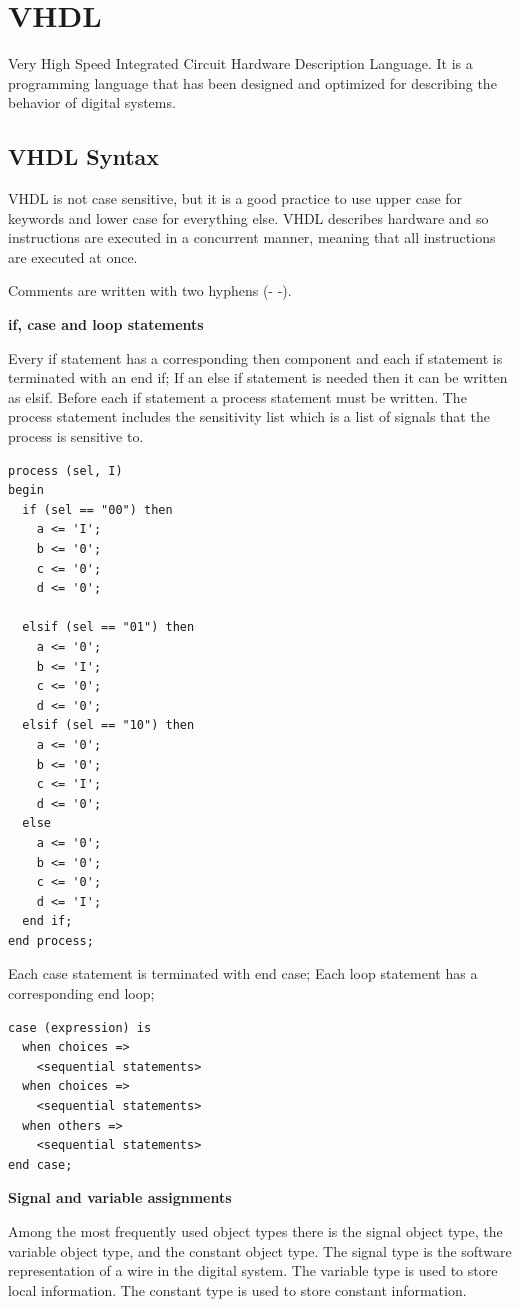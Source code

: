 \section{VHDL}
Very High Speed Integrated Circuit Hardware Description Language.
It is a programming language that has been designed and optimized for describing
the behavior of digital systems.

\subsection{VHDL Syntax}

VHDL is not case sensitive, but it is a good practice to use upper case for keywords and lower case for everything else.
VHDL describes hardware and so instructions are executed in a concurrent manner, meaning that all instructions are executed at once.


Comments are written with two hyphens (- -).


\textbf{if, case and loop statements}

Every if statement has a corresponding then component and each if statement is terminated with an end if;
If an else if statement is needed then it can be written as elsif. Before
each if statement a process statement must be written. The process
statement includes the sensitivity list which is a list of signals that the process is sensitive to.

\begin{verbatim}
process (sel, I)
begin
  if (sel == "00") then
    a <= 'I';
    b <= '0';
    c <= '0';
    d <= '0';
      
  elsif (sel == "01") then
    a <= '0';
    b <= 'I';
    c <= '0';
    d <= '0';
  elsif (sel == "10") then
    a <= '0';
    b <= '0';
    c <= 'I';
    d <= '0';
  else
    a <= '0';
    b <= '0';
    c <= '0';
    d <= 'I';
  end if;
end process;
\end{verbatim}


Each case statement is terminated with end case; Each loop statement has a corresponding end loop;

\begin{verbatim}
case (expression) is
  when choices =>
    <sequential statements>
  when choices =>
    <sequential statements>
  when others =>
    <sequential statements>
end case;
\end{verbatim}


\textbf{Signal and variable assignments}

Among the most frequently used object types there is the signal object type, the variable object type, and the constant object type.
The signal type is the software representation of a wire in the digital system.
The variable type is used to store local information.
The constant type is used to store constant information.

